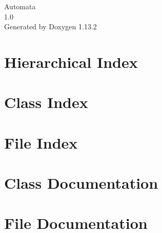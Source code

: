 \documentclass[twoside]{book}
\newcommand{\+}{\discretionary{\mbox{\scriptsize$\hookleftarrow$}}{}{}}
\newcommand{\clearemptydoublepage}{%
    \newpage{\pagestyle{empty}\cleardoublepage}%
  }
\begin{document}
  \raggedbottom
    \hypersetup{pageanchor=false,
                bookmarksnumbered=true,
                pdfencoding=unicode
               }
  \begin{titlepage}
  \vspace*{7cm}
  \begin{center}%
  {\Large Automata}\\
  [1ex]\large 1.\+0 \\
  \vspace*{1cm}
  {\large Generated by Doxygen 1.13.2}\\
  \end{center}
  \end{titlepage}
  \clearemptydoublepage
  \tableofcontents
  \clearemptydoublepage
  \hypersetup{pageanchor=true}
\chapter{Hierarchical Index}

\chapter{Class Index}

\chapter{File Index}

\chapter{Class Documentation}















\chapter{File Documentation}










  \backmatter
  \newpage
  \clearemptydoublepage
  \printindex
\end{document}
